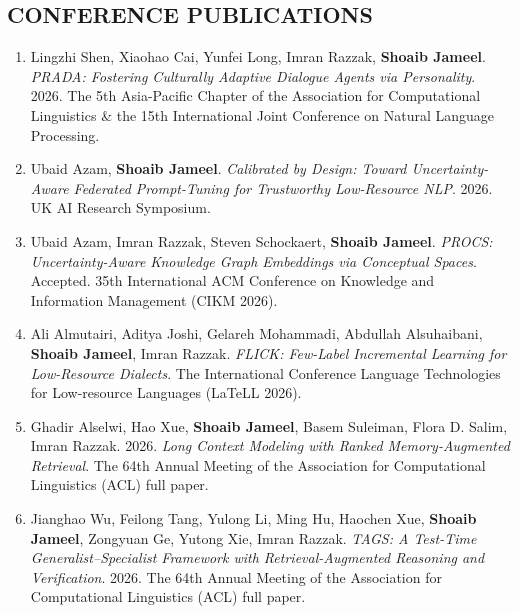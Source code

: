\documentclass[margin]{res}
\begin{document}
\begin{resume}
\section{CONFERENCE PUBLICATIONS}
\begin{enumerate} \itemsep -10pt

\item Lingzhi Shen, Xiaohao Cai, Yunfei Long, Imran Razzak, \textbf{Shoaib Jameel}. \textit{PRADA: Fostering Culturally Adaptive Dialogue Agents via Personality}. 2026. The 5th Asia-Pacific Chapter of the Association for Computational Linguistics \& the 15th International Joint Conference on Natural Language Processing. \\

\item Ubaid	Azam, \textbf{Shoaib	Jameel}. \textit{Calibrated by Design: Toward Uncertainty-Aware Federated Prompt-Tuning for Trustworthy Low-Resource NLP}. 2026. UK AI Research Symposium. \\

\item Ubaid	Azam, Imran	Razzak, Steven	Schockaert, \textbf{Shoaib	Jameel}. \textit{PROCS: Uncertainty-Aware Knowledge Graph Embeddings via Conceptual Spaces}. Accepted. 35th International ACM Conference on Knowledge and Information Management (CIKM 2026). \\

\item Ali Almutairi, Aditya Joshi, Gelareh Mohammadi, Abdullah Alsuhaibani, \textbf{Shoaib Jameel}, Imran Razzak. \textit{FLICK: Few-Label Incremental Learning for Low-Resource Dialects}. The International Conference Language Technologies for Low-resource Languages (LaTeLL 2026). \\

\item Ghadir Alselwi, Hao Xue, \textbf{Shoaib Jameel}, Basem Suleiman, Flora D. Salim, Imran Razzak. 2026. \textit{Long Context Modeling with Ranked Memory-Augmented Retrieval}. The 64th Annual Meeting of the Association for Computational Linguistics (ACL) full paper. \\

\item Jianghao Wu, Feilong Tang, Yulong Li, Ming Hu, Haochen Xue, \textbf{Shoaib Jameel}, Zongyuan Ge, Yutong Xie, Imran Razzak. \textit{TAGS: A Test-Time Generalist–Specialist Framework with Retrieval-Augmented Reasoning and Verification}. 2026. The 64th Annual Meeting of the Association for Computational Linguistics (ACL) full paper. \\


\end{enumerate}
\end{resume}
\end{document}
